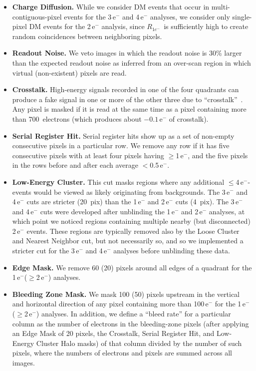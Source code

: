 \documentclass[aps,prl,twocolumn,showpacs,superscriptaddress,preprintnumbers]{revtex4-1}
\newcommand{\unit}[1]{\ensuremath{\mathrm{\,#1}}\xspace}
\newcommand{\e}{\unit{e^{-}}}
\newcommand{\Rs}{$R_{1e^-}$}
\begin{document}
\begin{itemize}[leftmargin=*]\addtolength{\itemsep}{-0.6\baselineskip}
\item {\bf Charge Diffusion.} While we consider DM events that occur in multi-contiguous-pixel events for the 3\e and 4\e analyses, we consider only single-pixel DM events for the 2\e analysis, since \Rs\ is sufficiently high to create random coincidences between neighboring pixels.  
\item {\bf Readout Noise.} 
We veto images in which the readout noise is 30\% larger than the expected readout noise as inferred from an over-scan region in which virtual (non-existent) pixels are read. 
%
\item {\bf Crosstalk.} 
High-energy signals recorded in one of the four quadrants can produce a fake signal in one or more of the other three due to ``crosstalk''~\cite{Bernstein:2017gsy}. Any pixel is masked if it is read at the same time as a pixel containing more than 700~electrons (which produces about $-0.1$\e of crosstalk).
%
\item {\bf Serial Register Hit.}
Serial register hits show up as a set of non-empty consecutive pixels in a particular row. We remove any row if it has five consecutive pixels with at least four pixels having $\ge$1\e, and the five pixels in the rows before and after each average $<$0.5\e. 
%
\item {\bf Low-Energy Cluster.} 
This cut masks regions where any additional $\le$4\e-events would be viewed as likely originating from backgrounds.  The 3\e and 4\e cuts are stricter (20~pix) than the 1\e and 2\e cuts (4~pix). The 3\e and 4\e cuts were developed after unblinding the 1\e and 2\e analyses, at which point we noticed regions containing multiple nearby (but disconnected) 2\e events.  These regions are typically removed also by the Loose Cluster and Nearest Neighbor cut, but not necessarily so, and so we implemented a stricter cut for the 3\e and 4\e analyses before unblinding these data.  
%
\item {\bf Edge Mask.}  We remove 60 (20) pixels around all edges of a quadrant for the 1\e ($\ge$2\e) analyses. 
%
\item {\bf Bleeding Zone Mask.}
We mask 100 (50) pixels upstream in the vertical and horizontal direction of any pixel containing more than 100\e for the 1\e ($\ge$2\e) analyses. 
In addition, we define a ``bleed rate'' for a particular column as the number of electrons in the bleeding-zone pixels (after applying an Edge Mask of 20 pixels, the Crosstalk, Serial Register Hit, and Low-Energy Cluster Halo masks) of that column divided by the number of such pixels, where the numbers of electrons and pixels are summed across all images. 

\end{itemize}
\end{document}
